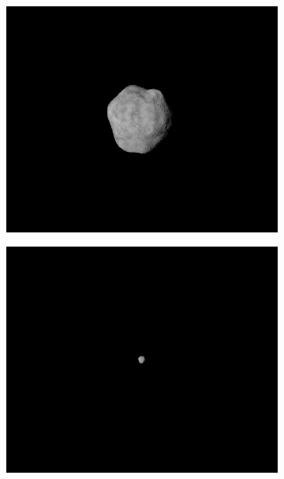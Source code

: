 \begin{figure}[htb]
    \centering
    \begin{subfigure}[b]{0.47\textwidth}
        \centering
        \includegraphics[width=\textwidth]{doc/thesis/0_figures/composition/SssbOnly_2017-08-15T115855-684000.png}
        \caption{}
        \label{fig:comp_sssbonly}
    \end{subfigure}
    \begin{subfigure}[b]{0.47\textwidth}
        \centering
        \includegraphics[width=\textwidth]{doc/thesis/0_figures/composition/SssbConstDist_2017-08-15T115855-684000.png}

\end{subfigure}
\end{figure}
